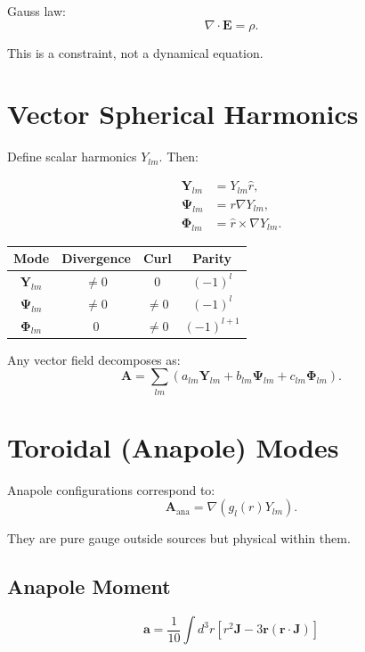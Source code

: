 \documentclass[11pt]{article}
\begin{document}
Gauss law:
\begin{equation}
\nabla \cdot \mathbf{E} = \rho.
\end{equation}

This is a constraint, not a dynamical equation.

\section{Vector Spherical Harmonics}

Define scalar harmonics \(Y_{lm}\). Then:

\begin{align}
\mathbf{Y}_{lm} &= Y_{lm}\hat{r}, \\
\mathbf{\Psi}_{lm} &= r\nabla Y_{lm}, \\
\mathbf{\Phi}_{lm} &= \hat{r} \times \nabla Y_{lm}.
\end{align}

\begin{center}
\begin{tabular}{c|c|c|c}
Mode & Divergence & Curl & Parity \\ \hline
$\mathbf{Y}_{lm}$ & $\neq 0$ & $0$ & $(-1)^l$ \\
$\mathbf{\Psi}_{lm}$ & $\neq 0$ & $\neq 0$ & $(-1)^l$ \\
$\mathbf{\Phi}_{lm}$ & $0$ & $\neq 0$ & $(-1)^{l+1}$
\end{tabular}
\end{center}

Any vector field decomposes as:
\[
\mathbf{A} = \sum_{lm}
\left(
a_{lm}\mathbf{Y}_{lm}
+ b_{lm}\mathbf{\Psi}_{lm}
+ c_{lm}\mathbf{\Phi}_{lm}
\right).
\]

\section{Toroidal (Anapole) Modes}

Anapole configurations correspond to:
\[
\mathbf{A}_{\text{ana}} = \nabla \left( g_l(r) Y_{lm} \right).
\]

They are pure gauge outside sources but physical within them.

\subsection*{Anapole Moment}

\begin{equation}
\boxed{
\mathbf{a} = \frac{1}{10}
\int d^3r
\left[
r^2 \mathbf{J}
- 3\mathbf{r}(\mathbf{r}\cdot\mathbf{J})
\right]
}
\end{equation}
\end{document}
